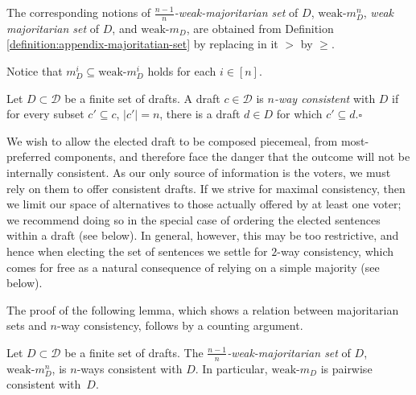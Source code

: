 \documentclass[sigconf]{aamas}  %
\newcommand{\qqed}{\hfill$\square$}
\newcommand{\calD}{\mathcal{D}}
\begin{document}
The corresponding notions of \emph{$\frac{n-1}{n}$-weak-majoritarian set} of $D$, $\textrm{weak-}m^n_D$, \emph{weak majoritarian set} of $D$, and $\textrm{weak-}m_D$, are obtained from Definition \ref{definition:appendix-majoritatian-set} by replacing  in it $>$ by $\ge$.

Notice that $m^i_D \subseteq \textrm{weak-}m^i_D$ holds for each $i \in [n]$.

\begin{definition}
Let $D \subset \calD$ be a finite set of drafts. A draft $c \in \calD$ is \emph{$n$-way consistent} with $D$ if for every subset $c' \subseteq c$, $|c'|=n$, there is a draft $d \in D$ for which $c' \subseteq d$.\qqed
\end{definition}

We wish to allow the elected draft to be composed piecemeal, from most-preferred components, and therefore face the danger that the outcome will not be internally consistent. As our only source of information is the voters, we must rely on them to offer consistent drafts.  If we strive for maximal consistency, then we limit our space of alternatives to those actually offered by at least one voter; we recommend doing so in the special case of ordering the elected sentences within a draft (see below).  In general, however, this may be too restrictive, and hence when electing the set of sentences we settle for $2$-way consistency, which comes for free as a natural consequence of relying on a simple majority (see below).

The proof of the following lemma, which shows a relation between majoritarian sets and $n$-way consistency, follows by a counting argument.

\begin{lemma}\label{lemma:wm-nwc}
  Let $D \subset \calD$ be a finite set of drafts. The \emph{$\frac{n-1}{n}$-weak-majoritarian set} of $D$, $\textrm{weak-}m^n_D$, is $n$-ways consistent with $D$. In particular, $\textrm{weak-}m_D$ is pairwise consistent with~$D$.
\end{lemma}
\end{document}

